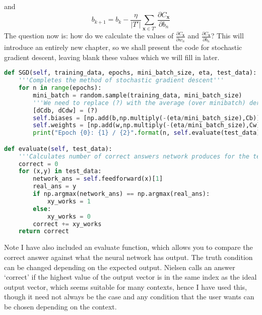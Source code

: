 \documentclass[10pt]{article}
\begin{document}
and
\[
b_{k+1} = b_k - \frac{\eta}{|T'|} \sum_{\mathbf{x} \in T'} \frac{\partial C_{\mathbf{x}}}{\partial b_n}
\]
The question now is: how do we calculate the values of $\frac{\partial C_{\mathbf{x}}}{\partial w_n}$ and $\frac{\partial C_{\mathbf{x}}}{\partial b_n}$? This will introduce an entirely new chapter, so we shall present the code for stochastic gradient descent, leaving blank these values which we will fill in later.
\begin{lstlisting}[language=Python, breaklines, basicstyle=\small]
def SGD(self, training_data, epochs, mini_batch_size, eta, test_data):
	'''Completes the method of stochastic gradient descent'''
	for n in range(epochs):
		mini_batch = random.sample(training_data, mini_batch_size)
		'''We need to replace (?) with the average (over minibatch) derivative of C wrt each term in bias/weight'''
		[dCdb, dCdw] = (?)
		self.biases = [np.add(b,np.multiply(-(eta/mini_batch_size),Cb)) for b, Cb in zip(self.biases, dCdb)]
		self.weights = [np.add(w,np.multiply(-(eta/mini_batch_size),Cw)) for w, Cw in zip(self.weights, dCdw)]
		print("Epoch {0}: {1} / {2}".format(n, self.evaluate(test_data), len(test_data)))

def evaluate(self, test_data):
	'''Calculates number of correct answers network produces for the test data'''
	correct = 0
	for (x,y) in test_data:
		network_ans = self.feedforward(x)[1]
		real_ans = y
		if np.argmax(network_ans) == np.argmax(real_ans):
			xy_works = 1
		else:
			xy_works = 0
		correct += xy_works
	return correct
\end{lstlisting}
Note I have also included an evaluate function, which allows you to compare the correct answer against what the neural network has output. The truth condition can be changed depending on the expected output. Nielsen calls an answer `correct' if the highest value of the output vector is in the same index as the ideal output vector, which seems suitable for many contexts, hence I have used this, though it need not always be the case and any condition that the user wants can be chosen depending on the context.
\end{document}
